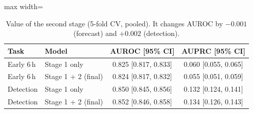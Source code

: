\begin{table}[!t]
\centering\scriptsize
\caption{Value of the second stage (5-fold CV, pooled). It changes AUROC by $-0.001$ (forecast) and $+0.002$ (detection).}
\label{tab:stage}
\begin{adjustbox}{max width=\linewidth}
\begin{tabular}{llcc}
\toprule
Task & Model & AUROC [95\% CI] & AUPRC [95\% CI] \\
\midrule
Early 6\,h & Stage 1 only & 0.825 [0.817, 0.833] & 0.060 [0.055, 0.065] \\
Early 6\,h & Stage 1 + 2 (final) & 0.824 [0.817, 0.832] & 0.055 [0.051, 0.059] \\
\midrule
Detection & Stage 1 only & 0.850 [0.845, 0.856] & 0.132 [0.124, 0.141] \\
Detection & Stage 1 + 2 (final) & 0.852 [0.846, 0.858] & 0.134 [0.126, 0.143] \\
\bottomrule
\end{tabular}
\end{adjustbox}
\end{table}

